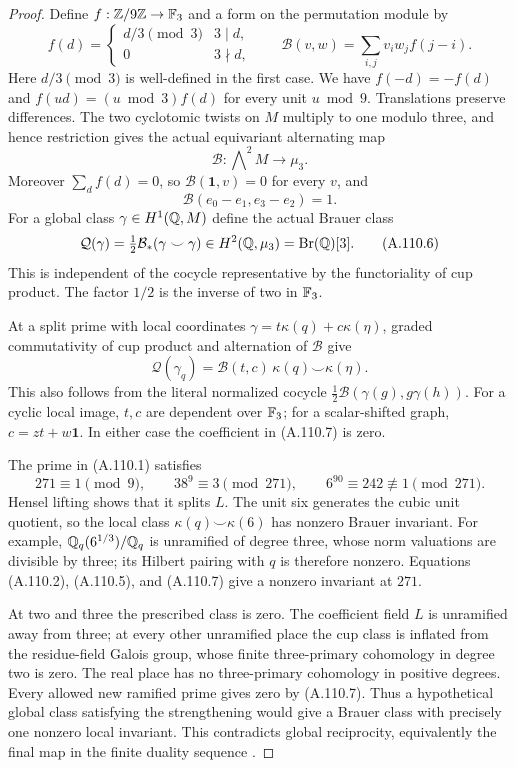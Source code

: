 \begin{proof}
Define $f:\mathbb Z/9\mathbb Z\to\mathbb F_3$ and a form on the permutation module by
\[
 f(d)=\begin{cases}d/3\pmod3&3\mid d,\\0&3\nmid d,\end{cases}
 \qquad
 \mathcal B(v,w)=\sum_{i,j}v_iw_j f(j-i).
 \tag{A.110.3}
\]
Here $d/3\pmod3$ is well-defined in the first case.
We have $f(-d)=-f(d)$ and
$f(ud)=(u\bmod3)f(d)$ for every unit $u\bmod9$.
Translations preserve differences.  The two cyclotomic twists
on $M$ multiply to one modulo three, and hence restriction gives
the actual equivariant alternating map
\[
             \mathcal B:\mathop{\bigwedge}\nolimits^2M\longrightarrow\mu_3.
 \tag{A.110.4}
\]
Moreover $\sum_d f(d)=0$, so $\mathcal B(\mathbf1,v)=0$ for
every $v$, and
\[
 \mathcal B(e_0-e_1,e_3-e_2)=1.
 \tag{A.110.5}
\]
For a global class $\gamma\in H^1(\mathbb Q,M)$ define the actual
Brauer class
\[
       \mathcal Q(\gamma)=\tfrac12\mathcal B_*(\gamma\smile\gamma)
                  \in H^2(\mathbb Q,\mu_3)=\operatorname{Br}(\mathbb Q)[3].
 \tag{A.110.6}
\]
This is independent of the cocycle representative by the
functoriality of cup product.  The factor $1/2$ is the inverse
of two in $\mathbb F_3$.

At a split prime with local coordinates
$\gamma=t\kappa(q)+c\kappa(\eta)$, graded commutativity of cup
product and alternation of $\mathcal B$ give
\[
       \mathcal Q(\gamma_q)
             =\mathcal B(t,c)\,\kappa(q)\smile\kappa(\eta).
 \tag{A.110.7}
\]
This also follows from the literal normalized cocycle
$\tfrac12\mathcal B(\gamma(g),g\gamma(h))$.
For a cyclic local image, $t,c$ are dependent over $\mathbb F_3$;
for a scalar-shifted graph, $c=zt+w\mathbf1$.
In either case the coefficient in (A.110.7) is zero.

The prime in (A.110.1) satisfies
\[
       271\equiv1\pmod9,\qquad 38^9\equiv3\pmod{271},
                    \qquad 6^{90}\equiv242\not\equiv1\pmod{271}.
 \tag{A.110.8}
\]
Hensel lifting shows that it splits $L$.
The unit six generates the cubic unit quotient, so the local
class $\kappa(q)\smile\kappa(6)$ has nonzero Brauer invariant.
For example, $\mathbb Q_q(6^{1/3})/\mathbb Q_q$ is unramified of degree three,
whose norm valuations are divisible by three; its Hilbert pairing
with $q$ is therefore nonzero.
Equations (A.110.2), (A.110.5), and (A.110.7) give a nonzero
invariant at $271$.

At two and three the prescribed class is zero.
The coefficient field $L$ is unramified away from three;
at every other unramified place the cup class is inflated from
the residue-field Galois group, whose finite three-primary
cohomology in degree two is zero.
The real place has no three-primary cohomology in positive degrees.
Every allowed new ramified prime gives zero by (A.110.7).
Thus a hypothetical global class satisfying the strengthening
would give a Brauer class with precisely one nonzero local
invariant.  This contradicts global reciprocity, equivalently
the final map in the finite duality sequence
\cite[I, Theorem 4.10(c)]{BIR_MilneADT}.


\end{proof}

